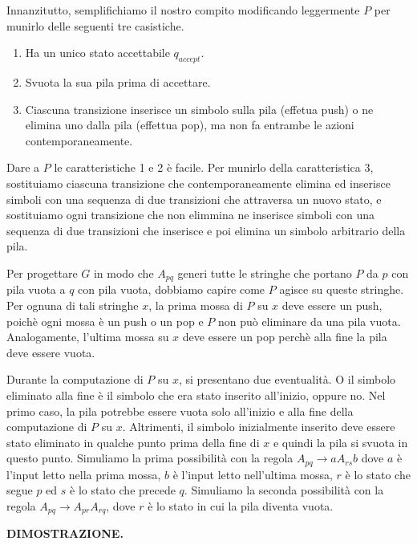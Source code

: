 \documentclass{article}
\begin{document}
Innanzitutto, semplifichiamo il nostro compito modificando leggermente $P$ per munirlo delle seguenti tre casistiche.

\begin{enumerate}
    \item Ha un unico stato accettabile $q_{accept}$.
    \item Svuota la sua pila prima di accettare.
    \item Ciascuna transizione inserisce un simbolo sulla pila (effetua push) o ne elimina uno dalla pila (effettua pop), ma non fa entrambe le azioni contemporaneamente.
\end{enumerate}

Dare a $P$ le caratteristiche 1 e 2 è facile.
Per munirlo della caratteristica 3, sostituiamo ciascuna transizione che contemporaneamente elimina ed inserisce simboli con una sequenza di due transizioni che attraversa un nuovo stato, e sostituiamo ogni transizione che non elimmina ne inserisce simboli con una sequenza di due transizioni che inserisce e poi elimina un simbolo arbitrario della pila.

Per progettare $G$ in modo che $A_{pq}$ generi tutte le stringhe che portano $P$ da $p$ con pila vuota a $q$ con pila vuota, dobbiamo capire come $P$ agisce su queste stringhe.
Per ognuna di tali stringhe $x$, la prima mossa di $P$ su $x$ deve essere un push, poichè ogni mossa è un push o un pop e $P$ non può eliminare da una pila vuota.
Analogamente, l'ultima mossa su $x$ deve essere un pop perchè alla fine la pila deve essere vuota.

Durante la computazione di $P$ su $x$, si presentano due eventualità.
O il simbolo eliminato alla fine è il simbolo che era stato inserito all'inizio, oppure no.
Nel primo caso, la pila potrebbe essere vuota solo all'inizio e alla fine della computazione di $P$ su $x$.
Altrimenti, il simbolo inizialmente inserito deve essere stato eliminato in qualche punto prima della fine di $x$ e quindi la pila si svuota in questo punto.
Simuliamo la prima possibilità con la regola $A_{pq} \rightarrow aA_{rs}b$ dove $a$ è l'input letto nella prima mossa, $b$ è l'input letto nell'ultima mossa, $r$ è lo stato che segue $p$ ed $s$ è lo stato che precede $q$.
Simuliamo la seconda possibilità con la regola $A_{pq} \rightarrow A_{pr}A_{rq}$, dove $r$ è lo stato in cui la pila diventa vuota.
\vspace{1em}

\textbf{DIMOSTRAZIONE.}
\end{document}
